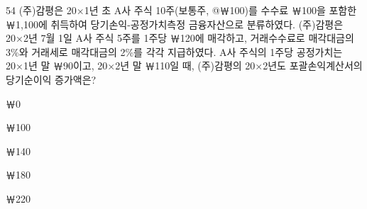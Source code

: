 \begin{question}{54}
(주)감평은 20×1년 초 A사 주식 10주(보통주, @￦100)를 수수료 ￦100을 포함한 ￦1,100에 취득하여 당기손익-공정가치측정 금융자산으로 분류하였다. (주)감평은 20×2년 7월 1일 A사 주식 5주를 1주당 ￦120에 매각하고, 거래수수료로 매각대금의 3\%와 거래세로 매각대금의 2\%를 각각 지급하였다. A사 주식의 1주당 공정가치는 20×1년 말 ￦90이고, 20×2년 말 ￦110일 때, (주)감평의 20×2년도 포괄손익계산서의 당기순이익 증가액은?
\begin{choices}
  \item ￦0
  \item ￦100
  \item ￦140
  \item ￦180
  \item ￦220
\end{choices}
\end{question}
